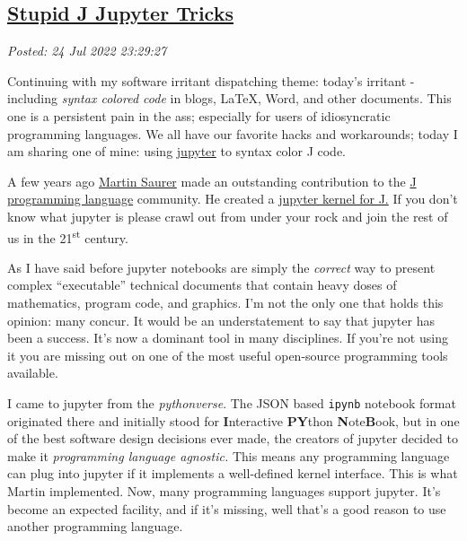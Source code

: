 %

\subsection*{\href{http://analyzethedatanotthedrivel.org/2022/07/24/stupid-j-jupyter-tricks/}{Stupid J Jupyter Tricks}}


\noindent\emph{Posted: 24 Jul 2022 23:29:27}
\vspace{6pt}

Continuing with my software irritant dispatching theme: today's irritant
- including \emph{syntax colored code} in blogs, \LaTeX, Word, and other
documents. This one is a persistent pain in the ass; especially for
users of idiosyncratic programming languages. We all have our favorite
hacks and workarounds; today I am sharing one of mine: using
\href{https://jupyter.org/}{jupyter} to syntax color J code.

A few years ago \href{https://github.com/martin-saurer}{Martin Saurer}
made an outstanding contribution to the
\href{https://code2.jsoftware.com/wiki/Main_Page}{J programming
language} community. He created a
\href{https://github.com/martin-saurer/jkernel}{jupyter kernel for J.}
If you don't know what jupyter is please crawl out from under your rock
and join the rest of us in the 21\textsuperscript{st} century.

As I have said before jupyter notebooks are simply the \emph{correct}
way to present complex ``executable'' technical documents that contain
heavy doses of mathematics, program code, and graphics. I'm not the only
one that holds this opinion: many concur. It would be an understatement
to say that jupyter has been a success. It's now a dominant tool in many
disciplines. If you're not using it you are missing out on one of the
most useful open-source programming tools available.

I came to jupyter from the \emph{pythonverse}. The JSON based \texttt{ipynb} notebook format
originated there and initially stood for \textbf{I}nteractive
\textbf{PY}thon \textbf{N}ote\textbf{B}ook, but in one of the best
software design decisions ever made, the creators of jupyter decided to
make it \emph{programming language agnostic.} This means any
programming language can plug into jupyter if it implements a
well-defined kernel interface. This is what Martin implemented. Now,
many programming languages support jupyter. It's become an expected
facility, and if it's missing, well that's a good reason to use another
programming language.

